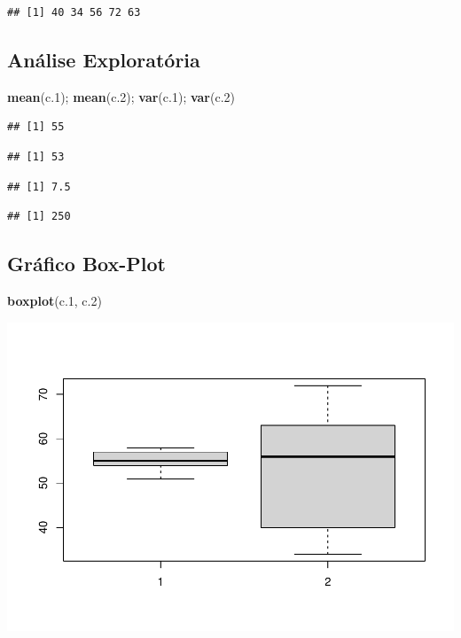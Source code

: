 \documentclass[
]{book}
\newenvironment{Shaded}{\begin{snugshade}}{\end{snugshade}}
\newcommand{\FloatTok}[1]{\textcolor[rgb]{0.00,0.00,0.81}{#1}}
\newcommand{\FunctionTok}[1]{\textcolor[rgb]{0.13,0.29,0.53}{\textbf{#1}}}
\newcommand{\NormalTok}[1]{#1}
\begin{document}
\begin{verbatim}
## [1] 40 34 56 72 63
\end{verbatim}

\subsection{Análise Exploratória}\label{anuxe1lise-exploratuxf3ria-1}

\begin{Shaded}
\begin{Highlighting}[]
\FunctionTok{mean}\NormalTok{(c}\FloatTok{.1}\NormalTok{); }\FunctionTok{mean}\NormalTok{(c}\FloatTok{.2}\NormalTok{); }\FunctionTok{var}\NormalTok{(c}\FloatTok{.1}\NormalTok{); }\FunctionTok{var}\NormalTok{(c}\FloatTok{.2}\NormalTok{)}
\end{Highlighting}
\end{Shaded}

\begin{verbatim}
## [1] 55
\end{verbatim}

\begin{verbatim}
## [1] 53
\end{verbatim}

\begin{verbatim}
## [1] 7.5
\end{verbatim}

\begin{verbatim}
## [1] 250
\end{verbatim}

\subsection{Gráfico Box-Plot}\label{gruxe1fico-box-plot-1}

\begin{Shaded}
\begin{Highlighting}[]
\FunctionTok{boxplot}\NormalTok{(c}\FloatTok{.1}\NormalTok{, c}\FloatTok{.2}\NormalTok{)}
\end{Highlighting}
\end{Shaded}

\includegraphics{_main_files/figure-latex/box1-1.pdf}
\end{document}
